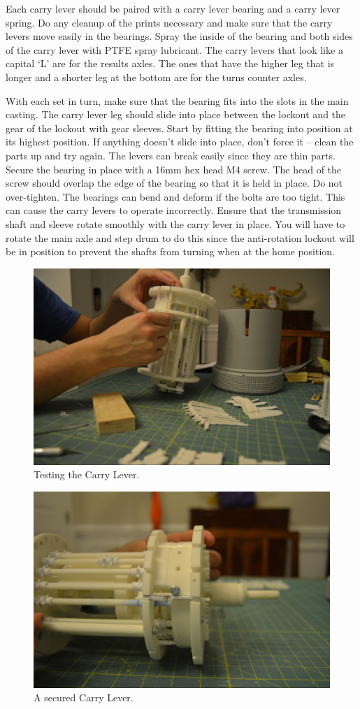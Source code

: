 \documentclass[openany]{book}
\begin{document}
Each carry lever should be paired with a carry lever bearing and a carry lever spring. Do any cleanup of the prints necessary and make sure that the carry levers move easily in the bearings. Spray the inside of the bearing and both sides of the carry lever with PTFE spray lubricant. The carry levers that look like a capital ‘L’ are for the results axles. The ones that have the higher leg that is longer and a shorter leg at the bottom are for the turns counter axles.

With each set in turn, make sure that the bearing fits into the slots in the main casting. The carry lever leg should slide into place between the lockout and the gear of the lockout with gear sleeves. Start by fitting the bearing into position at its highest position. If anything doesn’t slide into place, don’t force it -- clean the parts up and try again. The levers can break easily since they are thin parts. Secure the bearing in place with a 16mm hex head M4 screw. The head of the screw should overlap the edge of the bearing so that it is held in place. Do not over-tighten. The bearings can bend and deform if the bolts are too tight. This can cause the carry levers to operate incorrectly. Ensure that the transmission shaft and sleeve rotate smoothly with the carry lever in place. You will have to rotate the main axle and step drum to do this since the anti-rotation lockout will be in position to prevent the shafts from turning when at the home position.

\begin{figure}[!ht]
	\centering
	\includegraphics[width=.75\textwidth]{images/image52.jpg}
	\caption{Testing the Carry Lever.}
	\label{fig:image52}	
\end{figure}


\begin{figure}[!ht]
	\centering
	\includegraphics[width=.75\textwidth]{images/image57.jpg}
	\caption{A secured Carry Lever.}
	\label{fig:image57}	
\end{figure}
\end{document}
